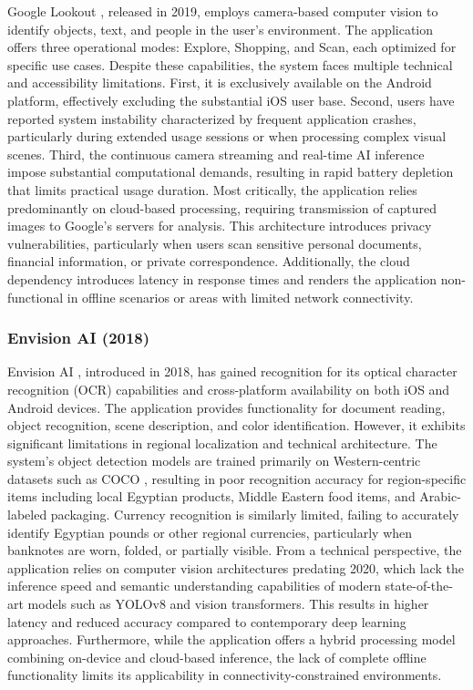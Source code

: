 \documentclass[a4paper]{report}
\begin{document}
Google Lookout \cite{google_lookout}, released in 2019, employs camera-based computer vision to identify objects, text, and people in the user's environment. The application offers three operational modes: Explore, Shopping, and Scan, each optimized for specific use cases. Despite these capabilities, the system faces multiple technical and accessibility limitations. First, it is exclusively available on the Android platform, effectively excluding the substantial iOS user base. Second, users have reported system instability characterized by frequent application crashes, particularly during extended usage sessions or when processing complex visual scenes. Third, the continuous camera streaming and real-time AI inference impose substantial computational demands, resulting in rapid battery depletion that limits practical usage duration. Most critically, the application relies predominantly on cloud-based processing, requiring transmission of captured images to Google's servers for analysis. This architecture introduces privacy vulnerabilities, particularly when users scan sensitive personal documents, financial information, or private correspondence. Additionally, the cloud dependency introduces latency in response times and renders the application non-functional in offline scenarios or areas with limited network connectivity.

\subsubsection{Envision AI (2018)}

Envision AI \cite{envision_ai}, introduced in 2018, has gained recognition for its optical character recognition (OCR) capabilities and cross-platform availability on both iOS and Android devices. The application provides functionality for document reading, object recognition, scene description, and color identification. However, it exhibits significant limitations in regional localization and technical architecture. The system's object detection models are trained primarily on Western-centric datasets such as COCO \cite{lin2014coco}, resulting in poor recognition accuracy for region-specific items including local Egyptian products, Middle Eastern food items, and Arabic-labeled packaging. Currency recognition is similarly limited, failing to accurately identify Egyptian pounds or other regional currencies, particularly when banknotes are worn, folded, or partially visible. From a technical perspective, the application relies on computer vision architectures predating 2020, which lack the inference speed and semantic understanding capabilities of modern state-of-the-art models such as YOLOv8 and vision transformers. This results in higher latency and reduced accuracy compared to contemporary deep learning approaches. Furthermore, while the application offers a hybrid processing model combining on-device and cloud-based inference, the lack of complete offline functionality limits its applicability in connectivity-constrained environments.
\end{document}
